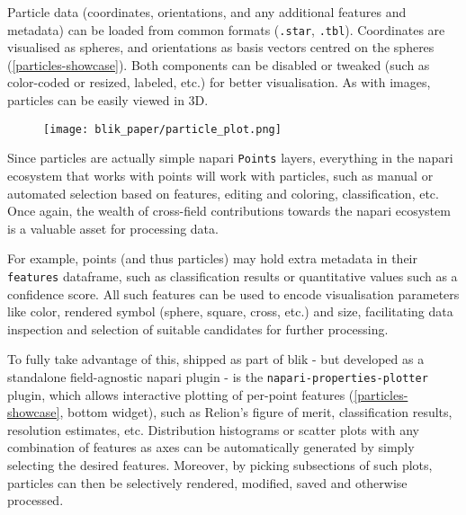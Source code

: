 Particle data (coordinates, orientations, and any additional features and metadata) can be loaded from common formats (\texttt{.star}, \texttt{.tbl}). Coordinates are visualised as spheres, and orientations as basis vectors centred on the spheres (\autoref{particles-showcase}). Both components can be disabled or tweaked (such as color-coded or resized, labeled, etc.) for better visualisation. As with images, particles can be easily viewed in 3D.

\begin{figure}[!ht]
    \centering
    \texttt{[image: blik\_paper/particle\_plot.png]}
    \label{particles-showcase}
\end{figure}

Since particles are actually simple napari \texttt{Points} layers, everything in the napari ecosystem that works with points will work with particles, such as manual or automated selection based on features, editing and coloring, classification, etc. Once again, the wealth of cross-field contributions towards the napari ecosystem is a valuable asset for processing data.

For example, points (and thus particles) may hold extra metadata in their \texttt{features} dataframe, such as classification results or quantitative values such as a confidence score. All such features can be used to encode visualisation parameters like color, rendered symbol (sphere, square, cross, etc.) and size, facilitating data inspection and selection of suitable candidates for further processing.

To fully take advantage of this, shipped as part of blik - but developed as a standalone field-agnostic napari plugin - is the \texttt{napari-properties-plotter} plugin, which allows interactive plotting of per-point features (\autoref{particles-showcase}, bottom widget), such as Relion's figure of merit, classification results, resolution estimates, etc. Distribution histograms or scatter plots with any combination of features as axes can be automatically generated by simply selecting the desired features. Moreover, by picking subsections of such plots, particles can then be selectively rendered, modified, saved and otherwise processed.

